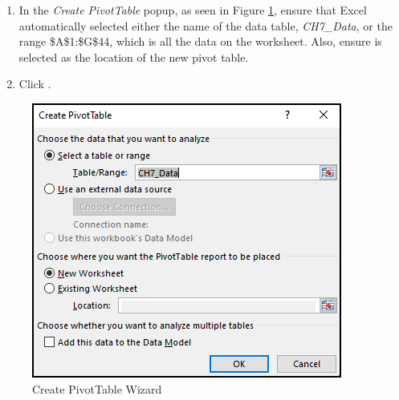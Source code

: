 \begin{enumerate}[resume]
	\item In the \textit{Create PivotTable} popup, as seen in Figure \ref{07:fig12}, ensure that Excel automatically selected either the name of the data table, \textit{CH7\_Data}, or the range \$A\$1:\$G\$44, which is all the data on the worksheet. Also, ensure  is selected as the location of the new pivot table. 
	\item Click .
\end{enumerate}

\begin{figure}[H]
	\centering
	\includegraphics[width=\maxwidth{.75\linewidth}]{gfx/ch07_fig12}
	\caption{Create PivotTable Wizard}
	\label{07:fig12}
\end{figure}


